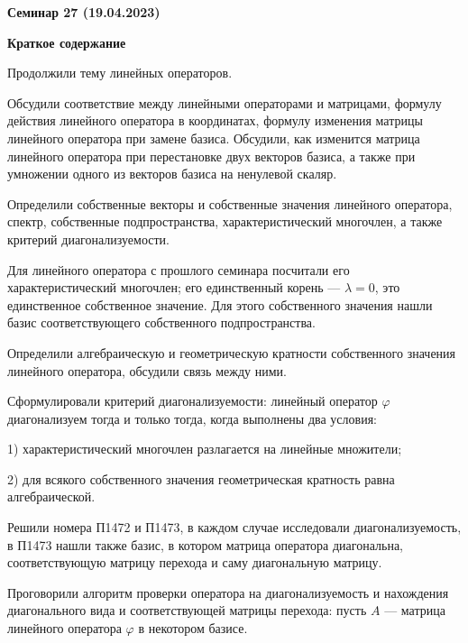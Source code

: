 \documentclass[10pt, a4paper]{extarticle}
\theoremstyle{definition}
\begin{document}
\begin{center}
\small
\noindent{}
\end{center}

\large

\begin{center}
\textbf{Семинар 27 (19.04.2023)}
\end{center}

\textbf{Краткое содержание}

Продолжили тему линейных операторов.

Обсудили соответствие между линейными операторами и матрицами, формулу действия линейного оператора в координатах, формулу изменения матрицы линейного оператора при замене базиса.
Обсудили, как изменится матрица линейного оператора при перестановке двух векторов базиса, а также при умножении одного из векторов базиса на ненулевой скаляр.

Определили собственные векторы и собственные значения линейного оператора, спектр, собственные подпространства, характеристический многочлен, а также критерий диагонализуемости.

Для линейного оператора с прошлого семинара посчитали его характеристический многочлен; его единственный корень --- $\lambda = 0$, это единственное собственное значение.
Для этого собственного значения нашли базис соответствующего собственного подпространства.

Определили алгебраическую и геометрическую кратности собственного значения линейного оператора, обсудили связь между ними.

Сформулировали критерий диагонализуемости: линейный оператор $\varphi$ диагонализуем тогда и только тогда, когда выполнены два условия:

1) характеристический многочлен разлагается на линейные множители;

2) для всякого собственного значения геометрическая кратность равна алгебраической.

Решили номера П1472 и П1473, в каждом случае исследовали диагонализуемость, в П1473 нашли также базис, в котором матрица оператора диагональна, соответствующую матрицу перехода и саму диагональную матрицу.

Проговорили алгоритм проверки оператора на диагонализуемость и нахождения диагонального вида и соответствующей матрицы перехода: пусть $A$ --- матрица линейного оператора $\varphi$ в некотором базисе.
\end{document}
